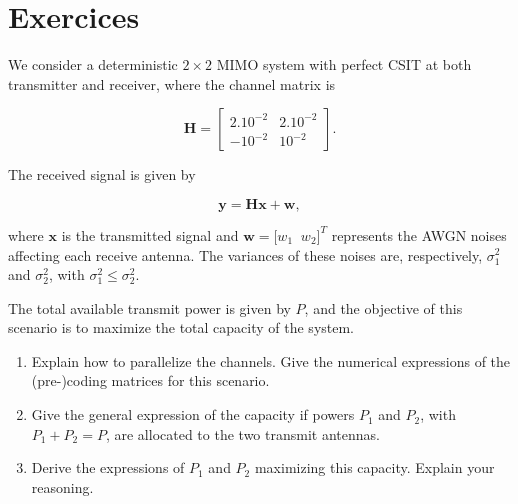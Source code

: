 \documentclass [a4paper, 11pt] {article}
\begin{document}
    \makesessiontitle
    
    \part*{Exercices}
    
    \begin{exercise}{1}
    
        We consider a deterministic $2\times 2$ MIMO system with perfect CSIT at both transmitter and receiver, where the channel matrix is

        \begin{equation}
            \mathbf{H} = \begin{bmatrix} 2.10^{-2} & 2.10^{-2} \\ -10^{-2} & 10^{-2} \end{bmatrix}.
        \end{equation}
        
        The received signal is given by
        
        \begin{equation}\mathbf{y=Hx+w},
        \end{equation}
        
        where $\mathbf{x}$ is the transmitted signal and $\mathbf{w} = \big[w_1 \; \; w_2\big]^T$ represents the AWGN noises affecting each receive antenna. The variances of these noises are, respectively, $\sigma_{1}^2$ and $\sigma_{2}^2$, with $\sigma_{1}^2 \leq \sigma_{2}^2$. 
        
        The total available transmit power is given by $P$, and the objective of this scenario is to maximize the total capacity of the system.
        
        \begin{enumerate}
            \item Explain how to parallelize the channels. Give the numerical expressions of the (pre-)coding matrices for this scenario.
            \item Give the general expression of the capacity if powers $P_1$ and $P_2$, with $P_1 + P_2 = P$, are allocated to the two transmit antennas.
            \item Derive the expressions of $P_1$ and $P_2$ maximizing this capacity. Explain your reasoning.
        \end{enumerate}
    
    \end{exercise}
    
\end{document}
